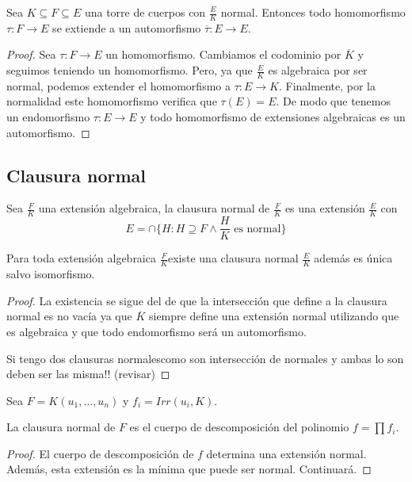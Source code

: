 \begin{theorem}
Sea $K \subseteq F \subseteq E$ una torre de cuerpos con $\frac{E}{K}$ normal. Entonces todo homomorfismo $\tau:F \to E$ se extiende a un automorfismo $\overline{\tau}:E \to E$. 
\end{theorem}
\begin{proof}
Sea $\tau:F \to E$ un homomorfismo. Cambiamos el codominio por $\overline{K}$ y seguimos teniendo un homomorfismo. Pero, ya que $\frac{E}{K}$ es algebraica por ser normal, podemos extender el homomorfismo a $\tau:E \to K$. Finalmente, por la normalidad este homomorfismo verifica que $\tau(E) = E$. De modo que tenemos un endomorfismo $\tau:E \to E$ y todo homomorfismo de extensiones algebraicas es un automorfismo.
\end{proof}

\subsection{Clausura normal}

\begin{definition}
Sea $\frac{F}{K}$ una extensión algebraica, la clausura normal de $\frac{F}{K}$ es una extensión $\frac{E}{K}$ con $$E = \cap \{H:H \supseteq F \land \frac{H}{K} \text{ es normal}\}$$
\end{definition}

\begin{proposition}
Para toda extensión algebraica $\frac{F}{K}$existe una clausura normal $\frac{E}{K}$ además es única salvo isomorfismo. 
\end{proposition}
\begin{proof}
La existencia se sigue del de que la intersección que define a la clausura normal es no vacía ya que $\overline{K}$ siempre define una extensión normal utilizando que es algebraica y que todo endomorfismo será un automorfismo.

Si tengo dos clausuras normalescomo son intersección de normales y ambas lo son deben ser las misma!! (revisar)
\end{proof}

\begin{proposition}
Sea $F = K(u_1,\ldots,u_n)$ y $f_i = Irr(u_i,K)$.

La clausura normal de $F$ es el cuerpo de descomposición del polinomio $f = \prod f_i$. 
\end{proposition}
\begin{proof}
El cuerpo de descomposición de $f$ determina una extensión normal. Además, esta extensión es la mínima que puede ser normal. Continuará. 
\end{proof}

